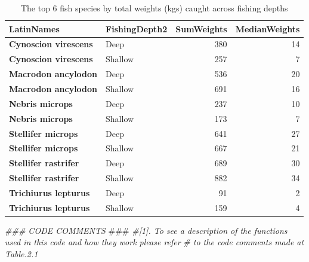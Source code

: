 \documentclass[
]{book}
\newenvironment{Shaded}{\begin{snugshade}}{\end{snugshade}}
\newcommand{\AlertTok}[1]{\textcolor[rgb]{0.94,0.16,0.16}{#1}}
\newcommand{\CommentTok}[1]{\textcolor[rgb]{0.56,0.35,0.01}{\textit{#1}}}
\begin{document}
\begin{table}

\caption{\label{tab:unnamed-chunk-16}The top 6 fish species by total weights (kgs) caught across fishing depths}
\centering
\begin{tabular}[t]{>{}l|l|r|r}
\hline
\textbf{LatinNames} & \textbf{FishingDepth2} & \textbf{SumWeights} & \textbf{MedianWeights}\\
\hline
\textbf{Cynoscion virescens} & Deep & 380 & 14\\
\hline
\textbf{Cynoscion virescens} & Shallow & 257 & 7\\
\hline
\textbf{Macrodon ancylodon} & Deep & 536 & 20\\
\hline
\textbf{Macrodon ancylodon} & Shallow & 691 & 16\\
\hline
\textbf{Nebris microps} & Deep & 237 & 10\\
\hline
\textbf{Nebris microps} & Shallow & 173 & 7\\
\hline
\textbf{Stellifer microps} & Deep & 641 & 27\\
\hline
\textbf{Stellifer microps} & Shallow & 667 & 21\\
\hline
\textbf{Stellifer rastrifer} & Deep & 689 & 30\\
\hline
\textbf{Stellifer rastrifer} & Shallow & 882 & 34\\
\hline
\textbf{Trichiurus lepturus} & Deep & 91 & 2\\
\hline
\textbf{Trichiurus lepturus} & Shallow & 159 & 4\\
\hline
\end{tabular}
\end{table}

\begin{Shaded}
\begin{Highlighting}[]
\CommentTok{### CODE COMMENTS }\AlertTok{###}
\CommentTok{#[1]. To see a description of the functions used in this code and how they work please refer }
\CommentTok{#     to the code comments made at Table.2.1}
\end{Highlighting}
\end{Shaded}
\end{document}
